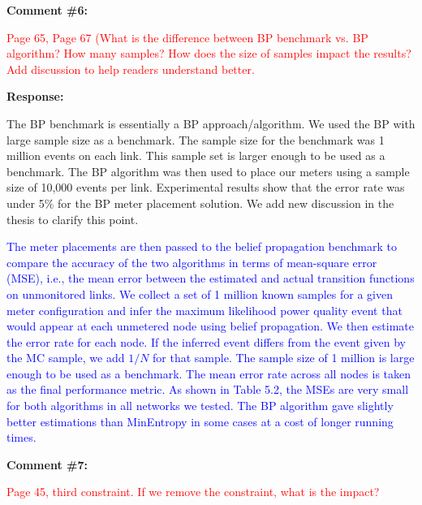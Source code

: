 \documentclass[journal]{IEEEtran}
\begin{document}
\vspace{30pt}
\textbf{Comment \#6:}
\begin{adjustwidth}{2.5em}{0pt}
\singlespacing \vspace{-10pt}
\textcolor{red}{Page 65, Page 67 (What is the difference between BP benchmark vs. BP algorithm? How many samples? How does the size of samples impact the results? Add discussion to help readers understand better.}
\end{adjustwidth}

\vspace{10pt}
\textbf{Response:}
\begin{adjustwidth}{2.5em}{0pt}
The BP benchmark is essentially a BP approach/algorithm. We used the BP with large sample size as a benchmark. The sample size for the benchmark was 1 million events on each link. This sample set is larger enough to be used as a benchmark. The BP algorithm was then used to place our meters using a sample size of 10,000 events per link. Experimental results show that the error rate was under 5\% for the BP meter placement solution. We add new discussion in the thesis to clarify this point.

\vspace{10pt}
\noindent\textcolor{blue}{The meter placements are then passed to the belief propagation benchmark to compare the accuracy of the two algorithms in terms of mean-square error (MSE), i.e., the mean error between the estimated and actual transition functions on unmonitored links. We collect a set of 1 million known samples for a given meter configuration and infer the maximum likelihood power quality event that would appear at each unmetered node using belief propagation. We then estimate the error rate for each node. If the inferred event differs from the event given by the MC sample, we add $1/N$ for that sample. The sample size of 1 million is large enough to be used as a benchmark. The mean error rate across all nodes is taken as the final performance metric. As shown in Table 5.2, the MSEs are very small for both algorithms in all networks we tested. The BP algorithm gave slightly better estimations than MinEntropy in some cases at a cost of longer running times.}
\end{adjustwidth}


\vspace{30pt}
\textbf{Comment \#7:}
\begin{adjustwidth}{2.5em}{0pt}
\singlespacing \vspace{-10pt}
\textcolor{red}{Page 45, third constraint. If we remove the constraint, what is the impact?}
\end{adjustwidth}
\end{document}
